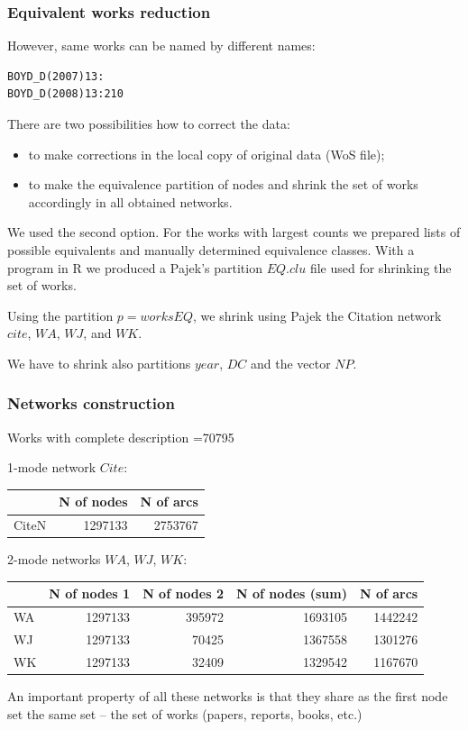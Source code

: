 \documentclass[hyperref={pdfstartview={FitBH -32768},
                         pdfpagemode=FullScreen,
                         plainpages=false,
                         colorlinks=true}
              ]{beamer}
\begin{document}
\begin{frame}[fragile]
\frametitle{Equivalent works reduction}
\small 
However, same works can be named by different names:
\begin{verbatim}
BOYD_D(2007)13:
BOYD_D(2008)13:210
\end{verbatim}

There are two possibilities how to correct the data:
\begin{itemize}
\item to make corrections in the local copy of original data (WoS file);
\item to make the equivalence partition of nodes and shrink the set of works accordingly in all  obtained networks.
\end{itemize}
We used the second option. For the works with largest counts we prepared lists of possible equivalents and manually determined equivalence classes. With a program in R we produced a Pajek's partition $EQ.clu$ file used for shrinking the set of works. \medskip

Using the partition $p=worksEQ$, we shrink using Pajek the Citation network $cite$, $WA$, $WJ$, and $WK$. \medskip

We have to shrink also partitions $year$,  $DC$ and the vector $NP$. 

\end{frame}

\begin{frame}[fragile]
\frametitle{Networks construction}
\small 

Works with complete description =70795 \medskip

1-mode network $Cite$: 

\begin{tabular}{l|r|r|}
 	& N of nodes & N of arcs \\ \hline		
CiteN	& 1297133	& 2753767	\\ \hline
\end{tabular}\bigskip
\medskip

2-mode networks $WA$, $WJ$, $WK$: 
\begin{tabular}{l|r|r|r|r|}
	& N of nodes 1	& N of nodes 2	& N of nodes (sum)	& N of arcs \\ \hline		 
WA	& 1297133	          & 395972	          & 1693105	           & 1442242 \\ 
WJ	& 1297133	          & 70425	          & 1367558	           & 1301276 \\ 
WK 	& 1297133	          & 32409	          & 1329542	           & 1167670 \\  \hline 
\end{tabular}\bigskip				

An important property of all these networks is that they share as the first node set the same set – the set of works (papers, reports, books, etc.) 

\end{frame}
\end{document}
